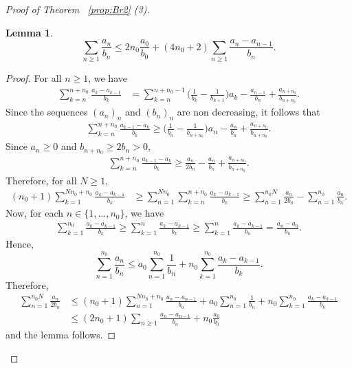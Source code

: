\documentclass[12pt,reqno,a4paper]{amsart}%
\numberwithin{equation}{section}
\newtheorem{lemma}[theorem]{Lemma}
\begin{document}
\begin{proof}[Proof of Theorem~ \ref{prop:Br2} (3)]
\begin{lemma}
	\[
	\sum_{n\geq 1}\frac{a_n}{b_n}\leq 2n_0\frac{a_0}{b_0}+(4n_0+2)\sum_{n\geq 1}\frac{a_{n}-a_{n-1}}{b_n}.
	\]
\end{lemma}
\begin{proof}
	For all $n\geq 1$, we have 
\begin{align*}
	\sum_{k=n}^{n+n_0}\frac{a_{k}-a_{k-1}}{b_k}
	&=\sum_{k=n}^{n+n_0-1}\big(\frac{1}{b_k}-\frac{1}{b_{k+1}}\big)a_k-\frac{a_{n-1}}{b_n}+\frac{a_{n+n_0}}{b_{n+n_0}}.
\end{align*}
Since the sequences  $(a_n)_{n}$ and $(b_n)_n$ are non decreasing, it follows that
\begin{align*}
	\sum_{k=n}^{n+n_0}\frac{a_{k-1}-a_k}{b_k}\geq 
	\big(\frac{1}{b_n}-\frac{1}{b_{n+n_0}}\big)a_n-\frac{a_{n}}{b_n}+\frac{a_{n+n_0}}{b_{n+n_0}}.
\end{align*}
Since $a_n\geq 0$ and $b_{n+n_0}\geq 2b_n>0$, 
\begin{align*}
	\sum_{k=n}^{n+n_0}\frac{a_{k-1}-a_k}{b_k}\geq 
	\frac{a_n}{2b_n}-\frac{a_{n}}{b_n}+\frac{a_{n+n_0}}{b_{n+n_0}}.
\end{align*}
Therefore, for all $N\geq 1$,
	\begin{align*}
		(n_0+1)\sum_{k= 1}^{Nn_0+n_0}\frac{a_{k}-a_{k-1}}{b_k}
		&\geq\sum_{n=1}^{Nn_0}\sum_{k=n}^{n+n_0}\frac{a_k-a_{k-1}}{b_k} \geq\sum_{n= 1}^{n_0N} \frac{a_n}{2b_n}-\sum_{n=1}^{n_0}\frac{a_{n}}{b_n}.
	\end{align*}
Now, for each $n\in\{1,\dots,n_0\}$, we have
\begin{align*}
	\sum_{k=1}^{n_0}\frac{a_k-a_{k-1}}{b_k}\geq \sum_{k=1}^n\frac{a_k-a_{k-1}}{b_k}\geq \sum_{k=1}^n\frac{a_k-a_{k-1}}{b_n}=\frac{a_n-a_0}{b_n}.
\end{align*}
Hence,
\[
 \sum_{n=1}^{n_0}\frac{a_{n}}{b_n}\leq a_0\sum_{n=1}^{n_0}\frac{1}{b_n}+n_0\sum_{k=1}^{n_0}\frac{a_k-a_{k-1}}{b_k}. 
\] 
Therefore, 
\begin{align*}
	\sum_{n= 1}^{n_0N} \frac{a_n}{2b_n}&\leq (n_0+1)\sum_{n= 1}^{Nn_0+n_0}\frac{a_{n}-a_{n-1}}{b_n} + a_0\sum_{n=1}^{n_0}\frac{1}{b_n}+n_0\sum_{k=1}^{n_0}\frac{a_k-a_{k-1}}{b_k}\\
	&\leq (2n_0+1)\sum_{n\geq 1}\frac{a_n-a_{n-1}}{b_n}+n_0\frac{a_0}{b_0}
\end{align*}
and the lemma follows.
\end{proof}


\end{proof}
\end{document}
